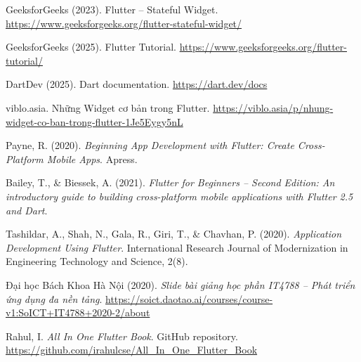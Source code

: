 \hypersetup{
  colorlinks=true,
  urlcolor=blue,
  linkcolor=black,
  citecolor=black
}

\begin{enumerate}[leftmargin=*, label={[\arabic*]}]
  \item GeeksforGeeks (2023). Flutter – Stateful Widget. \url{https://www.geeksforgeeks.org/flutter-stateful-widget/}
  \item GeeksforGeeks (2025). Flutter Tutorial. \url{https://www.geeksforgeeks.org/flutter-tutorial/}
  \item DartDev (2025). Dart documentation. \url{https://dart.dev/docs}
  \item viblo.asia. Những Widget cơ bản trong Flutter. \url{https://viblo.asia/p/nhung-widget-co-ban-trong-flutter-1Je5Eygy5nL}
  \item Payne, R. (2020). \textit{Beginning App Development with Flutter: Create Cross-Platform Mobile Apps}. Apress.
  \item Bailey, T., \& Biessek, A. (2021). \textit{Flutter for Beginners – Second Edition: An introductory guide to building cross-platform mobile applications with Flutter 2.5 and Dart}.
  \item Tashildar, A., Shah, N., Gala, R., Giri, T., \& Chavhan, P. (2020). \textit{Application Development Using Flutter}. International Research Journal of Modernization in Engineering Technology and Science, 2(8). 
  \item Đại học Bách Khoa Hà Nội (2020). \textit{Slide bài giảng học phần IT4788 – Phát triển ứng dụng đa nền tảng}. \url{https://soict.daotao.ai/courses/course-v1:SoICT+IT4788+2020-2/about} 
  \item Rahul, I. \textit{All In One Flutter Book}. GitHub repository. \url{https://github.com/irahulcse/All_In_One_Flutter_Book}
\end{enumerate}
